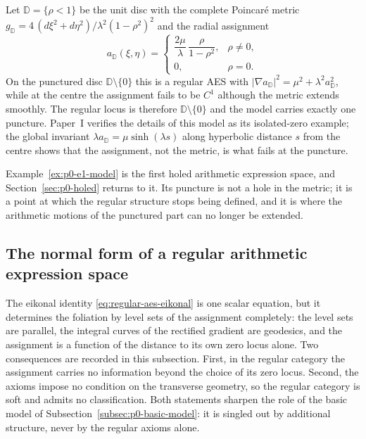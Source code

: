 \begin{example}[A one-puncture model, $k=1$]
\label{ex:p0-e1-model}
Let $\mathbb D=\{\rho<1\}$ be the unit disc with the complete Poincar\'e
metric $g_{\mathbb D}=4\,(d\xi^2+d\eta^2)/\lambda^2(1-\rho^2)^2$ and the radial
assignment
\[
 a_{\mathbb D}(\xi,\eta)=
 \begin{cases}
  \dfrac{2\mu}{\lambda}\,\dfrac{\rho}{1-\rho^2},&\rho\ne0,\\[6pt]
  0,&\rho=0 .
 \end{cases}
\]
On the punctured disc $\mathbb D\setminus\{0\}$ this is a regular AES with
$|\nabla a_{\mathbb D}|^2=\mu^2+\lambda^2a_{\mathbb D}^2$, while at the centre
the assignment fails to be $C^1$ although the metric extends smoothly.  The
regular locus is therefore $\mathbb D\setminus\{0\}$ and the model carries
exactly one puncture.  Paper~I verifies the details of this model as its
isolated-zero example; the global invariant $\lambda a_{\mathbb D}
=\mu\sinh(\lambda s)$ along hyperbolic distance $s$ from the centre shows that
the assignment, not the metric, is what fails at the puncture.
\end{example}

Example~\ref{ex:p0-e1-model} is the first holed arithmetic expression space, and
Section~\ref{sec:p0-holed} returns to it.  Its puncture is not a hole in the
metric; it is a point at which the regular structure stops being defined, and
it is where the arithmetic motions of the punctured part can no longer be
extended.

\subsection{The normal form of a regular arithmetic expression space}
\label{subsec:p0-normal-form}

The eikonal identity \eqref{eq:regular-aes-eikonal} is one scalar equation, but
it determines the foliation by level sets of the assignment completely: the
level sets are parallel, the integral curves of the rectified gradient are
geodesics, and the assignment is a function of the distance to its own zero
locus alone.  Two consequences are recorded in this subsection.  First, in the
regular category the assignment carries no information beyond the choice of its
zero locus.  Second, the axioms impose no condition on the transverse geometry,
so the regular category is soft and admits no classification.  Both statements
sharpen the role of the basic model of
Subsection~\ref{subsec:p0-basic-model}: it is singled out by additional
structure, never by the regular axioms alone.

